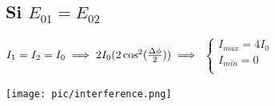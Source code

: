 \documentclass[12pt]{book}
\begin{document}
            \subsection*{Si $E_{01} = E_{02}$}
                \begin{center}
                    \begin{minipage}{0.49\linewidth}
                        $ I_1=I_2=I_0 \implies 2I_0(2\cos^2(\frac{\Delta\phi}{2})) \\ \implies$ 
                        $\begin{cases}
                            I_{max}=4I_0\\
                            I_{min}=0\\
                        \end{cases}$
                    \end{minipage}
                    \begin{minipage}{0.49\linewidth}
                        \texttt{[image: pic/interference.png]}                      
                    \end{minipage}
                \end{center}
\end{document}
